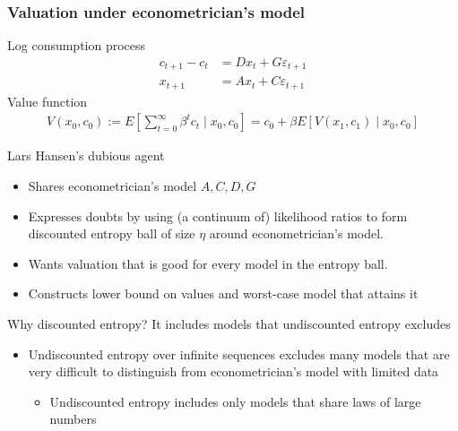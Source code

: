\documentclass{beamer}
\theoremstyle{Definition}
\begin{document}
\begin{frame}[fragile]
  \frametitle{Valuation under econometrician's  model}
Log consumption process %
\begin{align*}
c_{t+1} - c_t &= Dx_t + G\varepsilon_{t+1} \\
x_{t+1} &= Ax_t + C\varepsilon_{t+1}
\end{align*}
Value function
\begin{align*}
V(x_0, c_0) := E\left[ \sum_{t=0}^{\infty} \beta^t c_t \mid x_0, c_0 \right] = c_0 + \beta E\left[V(x_1, c_1) \mid x_0, c_0 \right]
\end{align*}

\end{frame}



\begin{frame}{Lars Hansen's  dubious agent}

\begin{itemize}
\item Shares  econometrician's model $A, C, D, G$
\item Expresses doubts  by using (a continuum of) likelihood ratios to form  discounted entropy ball
of size $\eta$ around econometrician's model.
\item Wants  valuation that is good for  every model in the entropy ball.
\item Constructs lower bound on values and  worst-case model that attains it

\end{itemize}

\end{frame}


\begin{frame}{Why discounted entropy?}
It includes models that undiscounted entropy excludes

\begin{itemize}
\item Undiscounted entropy over infinite sequences excludes many models that are very difficult to distinguish from econometrician's model with limited data
\begin{itemize}
\item Undiscounted entropy  includes  only models that share  laws of large numbers
\end{itemize}
\end{itemize}
\end{frame}
\end{document}

